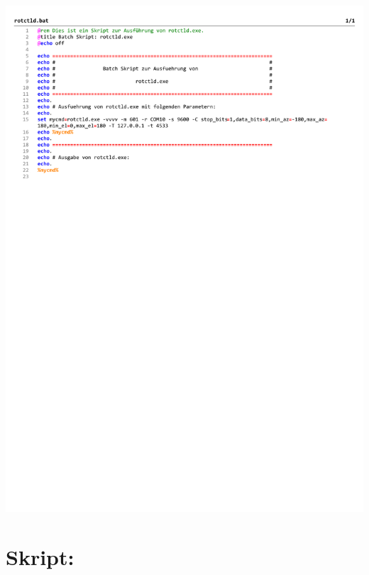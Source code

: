 \begin{center}
	\includegraphics[width=1\textwidth]{./appendicies/rotctld}
\end{center}


\chapter{Skript: }
\label{chap:rotctlbat}


